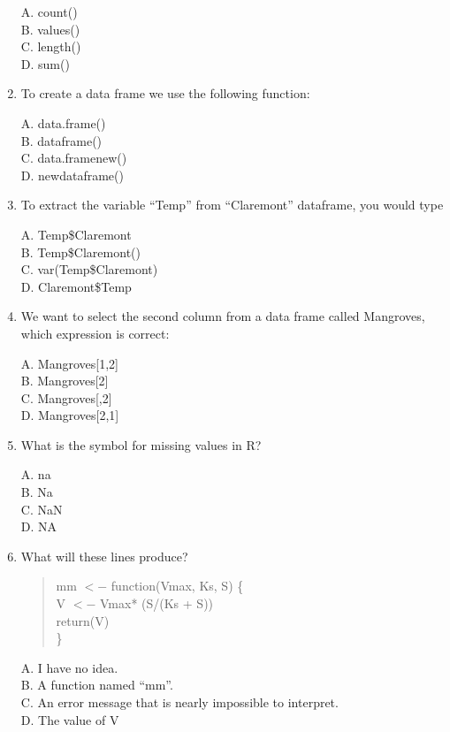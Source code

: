\documentclass[12pt]{article}\usepackage[]{graphicx}\usepackage[]{color}
\begin{document}
\begin{enumerate}
A. count() \\
B. values() \\
C. length() \\
D. sum() \\

\item To create a data frame we use the following function:

A. data.frame() \\
B. dataframe() \\
C. data.framenew()\\
D. newdataframe() \\

\item To extract the variable ``Temp'' from ``Claremont'' dataframe, you would type

A. Temp\$Claremont \\
B. Temp\$Claremont() \\
C. var(Temp\$Claremont)\\
D. Claremont\$Temp \\

\item We want to select the second column from a data frame called Mangroves, which expression is correct:

A. Mangroves[1,2] \\
B. Mangroves[2] \\
C. Mangroves[,2] \\
D. Mangroves[2,1] 

\item What is the symbol for missing values in R?

A. na \\
B. Na \\
C. NaN \\
D. NA 

\item What will these lines produce?

\begin{quote}
mm $<-$ function(Vmax, Ks, S) \{\\
V $<-$ Vmax* (S/(Ks + S)) \\
return(V)\\
\}

\end{quote}
 
A. I have no idea. \\
B. A function named ``mm''. \\
C. An error message that is nearly impossible to interpret. \\
D. The value of V 


\end{enumerate}
\end{document}
